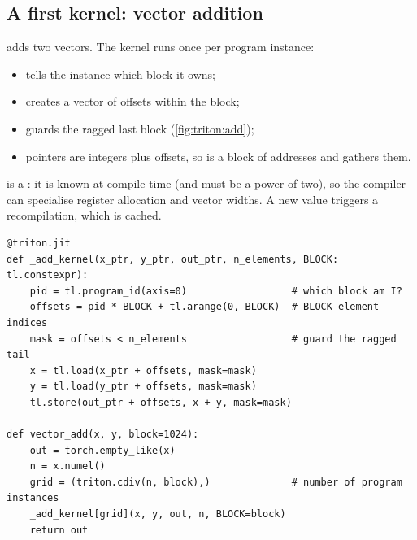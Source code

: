 \subsection{A first kernel: vector addition}
 adds two vectors. The  kernel runs once per
program instance:
\begin{itemize}
  \item {} tells the instance which block it owns;
  \item {} creates a vector of offsets within the block;
  \item {} guards the ragged last block (\cref{fig:triton:add});
  \item pointers are integers plus offsets, so  is a block of
        addresses and  gathers them.
\end{itemize}
 is a : it is known at compile time (and must be a power
of two), so the compiler can specialise register allocation and vector widths. A new
value triggers a recompilation, which is cached.

\begin{lstlisting}[caption={Vector addition in Triton, with its launcher.},label={lst:triton:add}]
@triton.jit
def _add_kernel(x_ptr, y_ptr, out_ptr, n_elements, BLOCK: tl.constexpr):
    pid = tl.program_id(axis=0)                  # which block am I?
    offsets = pid * BLOCK + tl.arange(0, BLOCK)  # BLOCK element indices
    mask = offsets < n_elements                  # guard the ragged tail
    x = tl.load(x_ptr + offsets, mask=mask)
    y = tl.load(y_ptr + offsets, mask=mask)
    tl.store(out_ptr + offsets, x + y, mask=mask)

def vector_add(x, y, block=1024):
    out = torch.empty_like(x)
    n = x.numel()
    grid = (triton.cdiv(n, block),)              # number of program instances
    _add_kernel[grid](x, y, out, n, BLOCK=block)
    return out
\end{lstlisting}

